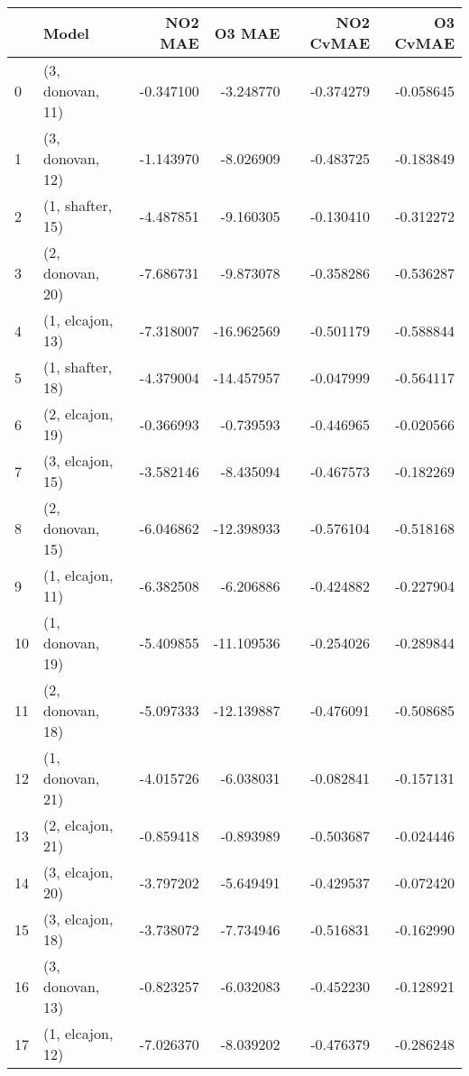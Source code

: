 \begin{tabular}{llrrrr}
\toprule
{} &             Model &   NO2 MAE &     O3 MAE &  NO2 CvMAE &  O3 CvMAE \\
\midrule
0  &  (3, donovan, 11) & -0.347100 &  -3.248770 &  -0.374279 & -0.058645 \\
1  &  (3, donovan, 12) & -1.143970 &  -8.026909 &  -0.483725 & -0.183849 \\
2  &  (1, shafter, 15) & -4.487851 &  -9.160305 &  -0.130410 & -0.312272 \\
3  &  (2, donovan, 20) & -7.686731 &  -9.873078 &  -0.358286 & -0.536287 \\
4  &  (1, elcajon, 13) & -7.318007 & -16.962569 &  -0.501179 & -0.588844 \\
5  &  (1, shafter, 18) & -4.379004 & -14.457957 &  -0.047999 & -0.564117 \\
6  &  (2, elcajon, 19) & -0.366993 &  -0.739593 &  -0.446965 & -0.020566 \\
7  &  (3, elcajon, 15) & -3.582146 &  -8.435094 &  -0.467573 & -0.182269 \\
8  &  (2, donovan, 15) & -6.046862 & -12.398933 &  -0.576104 & -0.518168 \\
9  &  (1, elcajon, 11) & -6.382508 &  -6.206886 &  -0.424882 & -0.227904 \\
10 &  (1, donovan, 19) & -5.409855 & -11.109536 &  -0.254026 & -0.289844 \\
11 &  (2, donovan, 18) & -5.097333 & -12.139887 &  -0.476091 & -0.508685 \\
12 &  (1, donovan, 21) & -4.015726 &  -6.038031 &  -0.082841 & -0.157131 \\
13 &  (2, elcajon, 21) & -0.859418 &  -0.893989 &  -0.503687 & -0.024446 \\
14 &  (3, elcajon, 20) & -3.797202 &  -5.649491 &  -0.429537 & -0.072420 \\
15 &  (3, elcajon, 18) & -3.738072 &  -7.734946 &  -0.516831 & -0.162990 \\
16 &  (3, donovan, 13) & -0.823257 &  -6.032083 &  -0.452230 & -0.128921 \\
17 &  (1, elcajon, 12) & -7.026370 &  -8.039202 &  -0.476379 & -0.286248 \\
\bottomrule
\end{tabular}
